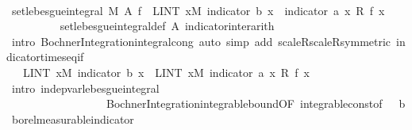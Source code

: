 \begin{isabellebody}
\ \ \ \ \ \ \isamarkupfalse%
\isanewline
\ \ \isanewline
\ \ \ \ \ \ \isamarkupfalse%
\ {\isachardoublequoteopen}set{\isacharunderscore}{\kern0pt}lebesgue{\isacharunderscore}{\kern0pt}integral\ M\ A\ f\ {\isacharequal}{\kern0pt}\ {\isacharparenleft}{\kern0pt}LINT\ x{\isacharbar}{\kern0pt}M{\isachardot}{\kern0pt}\ indicator\ b\ x\ {\isacharasterisk}{\kern0pt}\ {\isacharparenleft}{\kern0pt}indicator\ a\ x\ {\isacharasterisk}{\kern0pt}\isactrlsub R\ f\ x{\isacharparenright}{\kern0pt}{\isacharparenright}{\kern0pt}{\isachardoublequoteclose}\isanewline
\ \ \ \ \ \ \ \ \isamarkupfalse%
\ set{\isacharunderscore}{\kern0pt}lebesgue{\isacharunderscore}{\kern0pt}integral{\isacharunderscore}{\kern0pt}def\ A\ indicator{\isacharunderscore}{\kern0pt}inter{\isacharunderscore}{\kern0pt}arith\ \isanewline
\ \ \ \ \ \ \ \ \isamarkupfalse%
\ {\isacharparenleft}{\kern0pt}intro\ Bochner{\isacharunderscore}{\kern0pt}Integration{\isachardot}{\kern0pt}integral{\isacharunderscore}{\kern0pt}cong{\isacharcomma}{\kern0pt}\ auto\ simp\ add{\isacharcolon}{\kern0pt}\ scaleR{\isacharunderscore}{\kern0pt}scaleR{\isacharbrackleft}{\kern0pt}symmetric{\isacharbrackright}{\kern0pt}\ indicator{\isacharunderscore}{\kern0pt}times{\isacharunderscore}{\kern0pt}eq{\isacharunderscore}{\kern0pt}if{\isacharparenleft}{\kern0pt}{}{\isacharparenright}{\kern0pt}{\isacharparenright}{\kern0pt}\isanewline
\ \ \ \ \ \ \isamarkupfalse%
\ \isamarkupfalse%
\ {\isachardoublequoteopen}{\isachardot}{\kern0pt}{\isachardot}{\kern0pt}{\isachardot}{\kern0pt}\ {\isacharequal}{\kern0pt}\ {\isacharparenleft}{\kern0pt}LINT\ x{\isacharbar}{\kern0pt}M{\isachardot}{\kern0pt}\ indicator\ b\ x{\isacharparenright}{\kern0pt}\ {\isacharasterisk}{\kern0pt}\ {\isacharparenleft}{\kern0pt}LINT\ x{\isacharbar}{\kern0pt}M{\isachardot}{\kern0pt}\ indicator\ a\ x\ {\isacharasterisk}{\kern0pt}\isactrlsub R\ f\ x{\isacharparenright}{\kern0pt}{\isachardoublequoteclose}\ \isanewline
\ \ \ \ \ \ \ \ \isamarkupfalse%
\ {\isacharparenleft}{\kern0pt}intro\ indep{\isacharunderscore}{\kern0pt}var{\isacharunderscore}{\kern0pt}lebesgue{\isacharunderscore}{\kern0pt}integral\isanewline
\ \ \ \ \ \ \ \ \ \ \ \ \ \ \ \ \ \ Bochner{\isacharunderscore}{\kern0pt}Integration{\isachardot}{\kern0pt}integrable{\isacharunderscore}{\kern0pt}bound{\isacharbrackleft}{\kern0pt}OF\ integrable{\isacharunderscore}{\kern0pt}const{\isacharbrackleft}{\kern0pt}of\ {\isachardoublequoteopen}{}\ {\isacharcolon}{\kern0pt}{\isacharcolon}{\kern0pt}\ {\isacharprime}{\kern0pt}b{\isachardoublequoteclose}{\isacharbrackright}{\kern0pt}\ borel{\isacharunderscore}{\kern0pt}measurable{\isacharunderscore}{\kern0pt}indicator{\isacharbrackright}{\kern0pt}\isanewline

\end{isabellebody}
